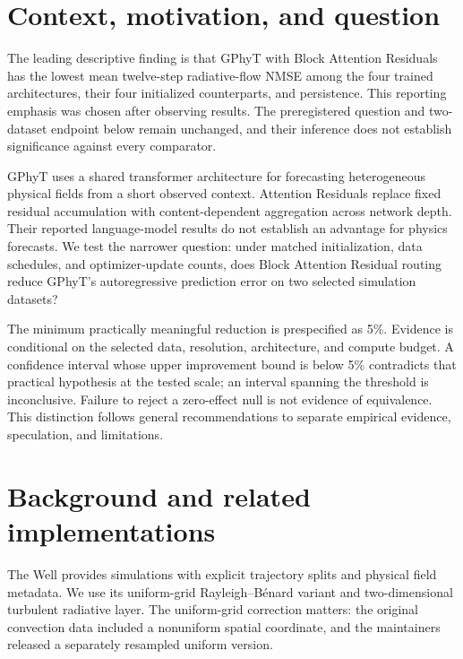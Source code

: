 \section{Context, motivation, and question}
The leading descriptive finding is that GPhyT with Block Attention Residuals has the lowest mean twelve-step radiative-flow NMSE among the four trained architectures, their four initialized counterparts, and persistence. This reporting emphasis was chosen after observing results. The preregistered question and two-dataset endpoint below remain unchanged, and their inference does not establish significance against every comparator.

GPhyT uses a shared transformer architecture for forecasting heterogeneous physical fields from a short observed context\cite{gphyt,gphytcode}. Attention Residuals replace fixed residual accumulation with content-dependent aggregation across network depth\cite{attnres,fla}. Their reported language-model results do not establish an advantage for physics forecasts. We test the narrower question: under matched initialization, data schedules, and optimizer-update counts, does Block Attention Residual routing reduce GPhyT's autoregressive prediction error on two selected simulation datasets?

The minimum practically meaningful reduction is prespecified as 5\%. Evidence is conditional on the selected data, resolution, architecture, and compute budget. A confidence interval whose upper improvement bound is below 5\% contradicts that practical hypothesis at the tested scale; an interval spanning the threshold is inconclusive. Failure to reject a zero-effect null is not evidence of equivalence. This distinction follows general recommendations to separate empirical evidence, speculation, and limitations\cite{lones,lipton}.

\section{Background and related implementations}
The Well provides simulations with explicit trajectory splits and physical field metadata\cite{well}. We use its uniform-grid Rayleigh--B\'enard variant and two-dimensional turbulent radiative layer. The uniform-grid correction matters: the original convection data included a nonuniform spatial coordinate, and the maintainers released a separately resampled uniform version\cite{wellrelease}.

